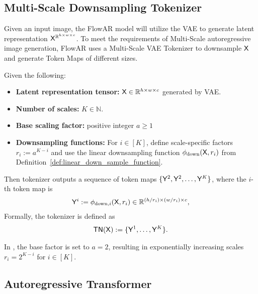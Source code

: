 \subsection{Multi-Scale Downsampling Tokenizer}\label{sec:downsample_tokenizer}
Given an input image, the FlowAR model will utilize the VAE to generate latent representation $\mathsf{X}^{\mathbb{R}^{h \times w \times c}}$. To meet the requirements of Multi-Scale autoregressive image generation, FlowAR uses a Multi-Scale VAE Tokenizer to downsample $\mathsf{X}$ and generate Token Maps of different sizes.
\begin{definition}\label{def:downsample_tokenizer}
 Given the following:
 \begin{itemize}
     \item {\bf Latent representation tensor:} $\mathsf{X}\in \mathbb{R}^{h \times w \times c}$ generated by VAE.
     \item {\bf Number of scales:} $K \in \mathbb{N}$.
     \item {\bf Base scaling factor:}  positive integer $a \geq 1$
     \item {\bf Downsampling functions:} For $i \in [K]$, define scale-specific factors $r_i := a^{K-i}$ and use the linear downsampling function $\phi_{\mathrm{down}}(\mathsf{X},r_i)$ from Definition~\ref{def:linear_down_sample_function}.
 \end{itemize}
 Then tokenizer outputs a sequence of token maps $\{\mathsf{Y}^2, \mathsf{Y}^2,\dots, \mathsf{Y}^K\}$, where the $i$-th token map is
 \begin{align*}
     \mathsf{Y}^i := \phi_{\mathrm{down},i}(\mathsf{X},r_i) \in \mathbb{R}^{(h / r_i) \times (w/r_i) \times c},
 \end{align*}
 Formally, the tokenizer is defined as
 \begin{align*}
     \mathsf{TN}(\mathsf{X}) := \{\mathsf{Y}^{1}, \dots,\mathsf{Y}^{K}\}.
 \end{align*} 

\end{definition}
\begin{remark}
    In \cite{ryh+24}, the base factor is set to $a = 2$, resulting in exponentially increasing scales $r_i = 2^{K-i}$ for $i \in [K]$.
\end{remark}

\subsection{Autoregressive Transformer}\label{sec:ar_transformer}

